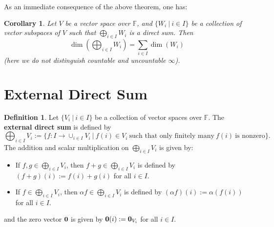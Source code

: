 \documentclass[11pt,openany]{book}
\theoremstyle{plain}
\newtheorem{corollary}[corollary]{Corollary}
\theoremstyle{definition}
\newtheorem{definition}[definition]{Definition}
\theoremstyle{remark}
\begin{document}
As an immediate consequence of the above theorem, one has:
\begin{corollary}
 Let $V$ be a vector space over $\mathbb{F}$, and $\{W_i\ |\ i \in I\}$ be a collection of vector subspaces of $V$ such that $\bigoplus_{i \in I} W_i$ is a direct sum. Then
    $$\dim\left(\bigoplus_{i \in I} W_i\right) = \sum_{i \in I} \dim(W_i)$$
    (here we do not distinguish countable and uncountable $\infty$).
\end{corollary}

\section{External Direct Sum} \label{sec-extdirectsum}
\begin{definition}
Let $\{V_i\ |\ i \in I\}$ be a collection of vector spaces over $\mathbb{F}$. The {\bf external direct sum} is defined by
$$\bigoplus_{i \in I} V_i := \{f: I \to \cup_{i \in I} V_i \ |\ f(i) \in V_i \ \text{such that only finitely many}\ f(i)\ \text{is nonzero}\}.$$
The addition and scalar multiplication on $\bigoplus_{i \in I} V_i$ is given by:
\begin{itemize}
\item If $f, g \in \bigoplus_{i \in I} V_i$, then $f+g \in \bigoplus_{i \in I} V_i$ is defined by $(f+g)(i) := f(i)+g(i)$ for all $i \in I$.
\item If $f \in \bigoplus_{i \in I} V_i$, then $\alpha f \in \bigoplus_{i \in I} V_i$ is defined by $(\alpha f)(i) := \alpha(f(i))$ for all $i \in I$.
\end{itemize}
and the zero vector ${\bf 0}$ is given by ${\bf 0}(i) := {\bf 0}_{V_i}$ for all $i \in I$.
\end{definition}
\end{document}
